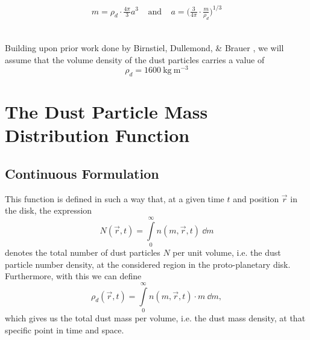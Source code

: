 
    \begin{align}
        m
            =\rho_d\cdot\frac{4\pi}{3}a^3
        \ \ \ \ \ \text{and}\ \ \ \ \
        a
            =\bigg(\frac{3}{4\pi}\cdot\frac{m}{\rho_d}\bigg)^{1/3}
    \end{align}

     \\

    Building upon prior work done by Birnstiel, Dullemond, \& Brauer %
    \cite{birnstiel_dullemond_brauer_2010}, we will assume that the volume density of the dust 
    particles carries a value of
    $$\rho_d=\SI{1600}{\kilogram\ \meter^{-3}}$$

\clearpage\section{The Dust Particle Mass Distribution Function}

    \subsection{Continuous Formulation}

        This function is defined in such a way that, at a given time $t$ and position $\vec r$ 
        in the disk, the expression
        \begin{equation}
            N(\vec r, t)
                =\int\limits_0^\infty n(m,\vec r, t)\ \dd m
        \end{equation}
        denotes the total number of dust particles $N$ per unit volume, i.e. the dust particle
        number density, at the considered region in the proto-planetary disk. \\

        Furthermore, with this we can define 
        \begin{equation}
            \rho_d(\vec r, t)
                =\int\limits_0^\infty n(m,\vec r, t)\cdot m\ \dd m,
        \end{equation}
        which gives us the total dust mass per volume, i.e. the dust mass density, 
        at that specific point in time and space.

